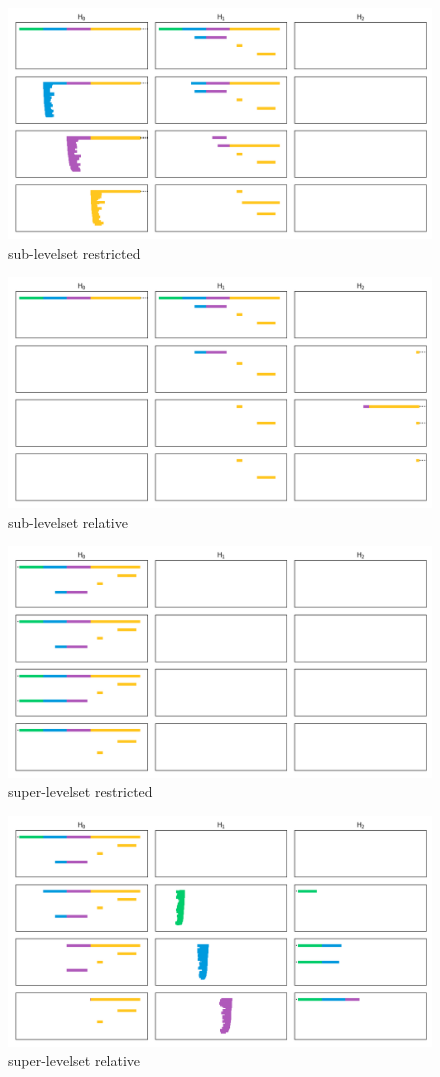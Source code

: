 \documentclass[12pt]{article}
\begin{document}
\begin{figure}
  \centering
  \includegraphics[scale=0.6]{scripts/figures/barcodes/sub_res.png}
  \caption{sub-levelset restricted}
\end{figure}
\begin{figure}
  \centering
  \includegraphics[scale=0.6]{scripts/figures/barcodes/sub_rel.png}
  \caption{sub-levelset relative}
\end{figure}
\begin{figure}
  \centering
  \includegraphics[scale=0.6]{scripts/figures/barcodes/super_res.png}
  \caption{super-levelset restricted}
\end{figure}
\begin{figure}
  \centering
  \includegraphics[scale=0.6]{scripts/figures/barcodes/super_rel.png}
  \caption{super-levelset relative}
\end{figure}
\end{document}
